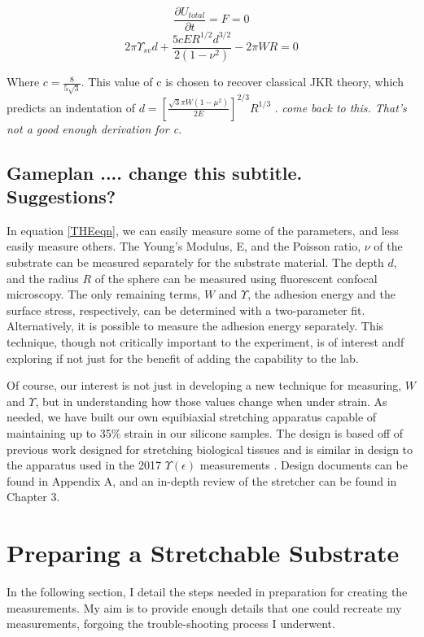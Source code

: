 \begin{equation*}
\frac{\partial U_{total}}{\partial t} = F = 0
\end{equation*}
\begin{equation}
\label{THEeqn}
2 \pi \Upsilon_{sv}d  + \frac{5cER^{1/2}d^{3/2}}{2 \left( 1-\nu ^2 \right) }  - 2 \pi WR = 0
\end{equation}

Where $ c = \frac{8}{5\sqrt{3}} $. This value of c is chosen to recover classical JKR theory, which predicts an indentation of $ d =  \left[\frac{\sqrt{3}\pi W (1 - \mu^2)}{2E} \right]^{2/3}R^{1/3}$ \cite{style2013surface}. \emph{come back to this. That's not a good enough derivation for c.}


\subsection{Gameplan .... change this subtitle. Suggestions?}
In equation \ref{THEeqn}, we can easily measure some of the parameters, and less easily measure others. The Young's Modulus, E, and the Poisson ratio, $\nu$ of the substrate can be measured separately for the substrate material. The depth $d$, and the radius $R$ of the sphere can be measured using fluorescent confocal microscopy. The only remaining terms, $W$ and $\Upsilon$, the adhesion energy and the surface stress, respectively, can be determined with a two-parameter fit. Alternatively, it is possible to measure the adhesion energy separately. This technique, though not critically important to the experiment, is of interest andf exploring if not just for the benefit of adding the capability to the lab.   

Of course, our interest is not just in developing a new technique for measuring, $W$ and $\Upsilon$, but in understanding how those values change when under strain. As needed, we have built our own equibiaxial stretching apparatus capable of maintaining up to 35\% strain in our silicone samples. The design is based off of previous work designed for stretching biological tissues \cite{na2008time} and is similar in design to the apparatus used in the 2017 $\Upsilon(\epsilon)$ measurements \cite{xu2017direct}. Design documents can be found in Appendix A, and an in-depth review of the stretcher can be found in Chapter 3. 

\section{Preparing a Stretchable Substrate}
In the following section, I detail the steps needed in preparation for creating the measurements. My aim is to provide enough details that one could recreate my measurements, forgoing the trouble-shooting process I underwent. 

